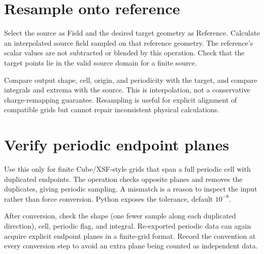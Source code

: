 \section{Resample onto reference}
Select the source as Field and the desired target geometry as Reference. Calculate an interpolated source field sampled on that reference geometry. The reference's scalar values are not subtracted or blended by this operation. Check that the target points lie in the valid source domain for a finite source.

Compare output shape, cell, origin, and periodicity with the target, and compare integrals and extrema with the source. This is interpolation, not a conservative charge-remapping guarantee. Resampling is useful for explicit alignment of compatible grids but cannot repair inconsistent physical calculations.

\section{Verify periodic endpoint planes}
Use this only for finite Cube/XSF-style grids that span a full periodic cell with duplicated endpoints. The operation checks opposite planes and removes the duplicates, giving periodic sampling. A mismatch is a reason to inspect the input rather than force conversion. Python exposes the tolerance, default $10^{-8}$.

After conversion, check the shape (one fewer sample along each duplicated direction), cell, periodic flag, and integral. Re-exported periodic data can again acquire explicit endpoint planes in a finite-grid format. Record the convention at every conversion step to avoid an extra plane being counted as independent data.
